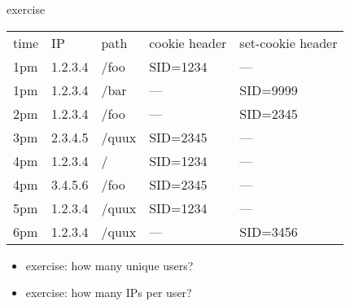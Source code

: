 \begin{frame}{exercise}
\fontsize{9}{10}\selectfont
\begin{tabular}{lllll}
time & IP & path & cookie header & set-cookie header \\
1pm & 1.2.3.4 & /foo & SID=1234 & --- \\
1pm & 1.2.3.4 & /bar & --- & SID=9999 \\
2pm & 1.2.3.4 & /foo & --- & SID=2345 \\
3pm & 2.3.4.5 & /quux & SID=2345 & --- \\
4pm & 1.2.3.4  & /& SID=1234& --- \\
4pm & 3.4.5.6 & /foo & SID=2345 & --- \\
5pm & 1.2.3.4  & /quux & SID=1234& --- \\
6pm & 1.2.3.4  & /quux & --- & SID=3456 \\
\end{tabular}
\begin{itemize}
\item exercise: how many unique users?
\item exercise: how many IPs per user?
\end{itemize}
\end{frame}
